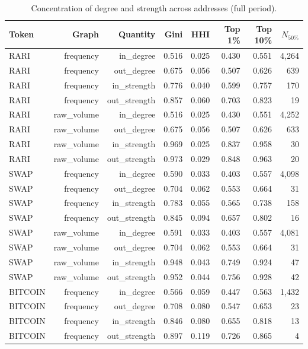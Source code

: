 \begin{table}[t]
\centering
\small
\caption{Concentration of degree and strength across addresses (full period).}
\label{tab:concentration}
\begin{tabular}{lrrrrrrr}
\toprule
Token & Graph & Quantity & Gini & HHI & Top 1\% & Top 10\% & $N_{50\%}$ \\
\midrule
RARI & frequency & in\_degree & 0.516 & 0.025 & 0.430 & 0.551 & 4{,}264 \\
RARI & frequency & out\_degree & 0.675 & 0.056 & 0.507 & 0.626 & 639 \\
RARI & frequency & in\_strength & 0.776 & 0.040 & 0.599 & 0.757 & 170 \\
RARI & frequency & out\_strength & 0.857 & 0.060 & 0.703 & 0.823 & 19 \\
RARI & raw\_volume & in\_degree & 0.516 & 0.025 & 0.430 & 0.551 & 4{,}252 \\
RARI & raw\_volume & out\_degree & 0.675 & 0.056 & 0.507 & 0.626 & 633 \\
RARI & raw\_volume & in\_strength & 0.969 & 0.025 & 0.837 & 0.958 & 30 \\
RARI & raw\_volume & out\_strength & 0.973 & 0.029 & 0.848 & 0.963 & 20 \\
SWAP & frequency & in\_degree & 0.590 & 0.033 & 0.403 & 0.557 & 4{,}098 \\
SWAP & frequency & out\_degree & 0.704 & 0.062 & 0.553 & 0.664 & 31 \\
SWAP & frequency & in\_strength & 0.783 & 0.055 & 0.565 & 0.738 & 158 \\
SWAP & frequency & out\_strength & 0.845 & 0.094 & 0.657 & 0.802 & 16 \\
SWAP & raw\_volume & in\_degree & 0.591 & 0.033 & 0.403 & 0.557 & 4{,}081 \\
SWAP & raw\_volume & out\_degree & 0.704 & 0.062 & 0.553 & 0.664 & 31 \\
SWAP & raw\_volume & in\_strength & 0.948 & 0.043 & 0.749 & 0.924 & 47 \\
SWAP & raw\_volume & out\_strength & 0.952 & 0.044 & 0.756 & 0.928 & 42 \\
BITCOIN & frequency & in\_degree & 0.566 & 0.059 & 0.447 & 0.563 & 1{,}432 \\
BITCOIN & frequency & out\_degree & 0.708 & 0.080 & 0.547 & 0.653 & 23 \\
BITCOIN & frequency & in\_strength & 0.846 & 0.080 & 0.655 & 0.818 & 13 \\
BITCOIN & frequency & out\_strength & 0.897 & 0.119 & 0.726 & 0.865 & 4 \\

\end{tabular}
\end{table}
